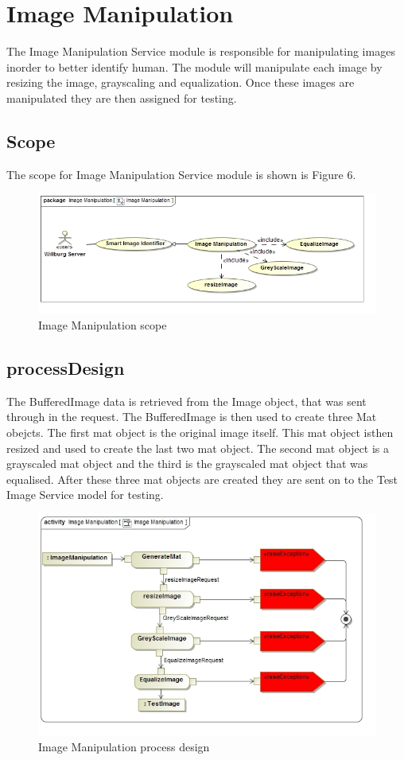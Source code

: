 \documentclass[a4paper,12pt]{report}
\begin{document}
	
	\section {Image Manipulation}
	\hfill \break
The Image Manipulation Service module is responsible for manipulating images inorder to better identify human. The module will manipulate each image by resizing the image, grayscaling and equalization. Once these images are manipulated they are then assigned for testing.
		\subsection {Scope}
			The scope for Image Manipulation Service module is shown is Figure 6.
			\begin{figure}[htb]
				\centering
				\includegraphics [scale=0.5]{../Diagrams/ImageManipulation_Scope.jpg}
				\caption{Image Manipulation scope}
			\end{figure}	
			\FloatBarrier

		\subsection {processDesign}
		The BufferedImage data is retrieved from the Image object, that was sent through in the request. The BufferedImage is then used to create three Mat obejcts. The first mat object is the original image itself. This mat object isthen resized and used to create the last two mat object. The second mat object is a grayscaled mat object and the third is the grayscaled mat object that was equalised. After these three mat objects are created they are sent on to the Test Image Service model for testing.
			\FloatBarrier
			\begin{figure}[htb]
				\centering
				\includegraphics [scale=0.5]{../Diagrams/ImageManipulation_ActivityDiagram.jpg}
				\caption{Image Manipulation process design}
			\end{figure}	
			\FloatBarrier
\end{document}

